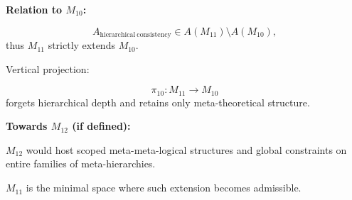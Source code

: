 \textbf{Relation to $M_{10}$:}

\[
A_{\mathrm{hierarchical\ consistency}} \in A(M_{11}) \setminus A(M_{10}),
\]
thus $M_{11}$ strictly extends $M_{10}$.

Vertical projection:

\[
\pi_{10}: M_{11} \to M_{10}
\]
forgets hierarchical depth and retains only meta-theoretical structure.

\textbf{Towards $M_{12}$ (if defined):}

$M_{12}$ would host scoped meta-meta-logical structures and  
global constraints on entire families of meta-hierarchies.

$M_{11}$ is the minimal space where such extension becomes admissible.

